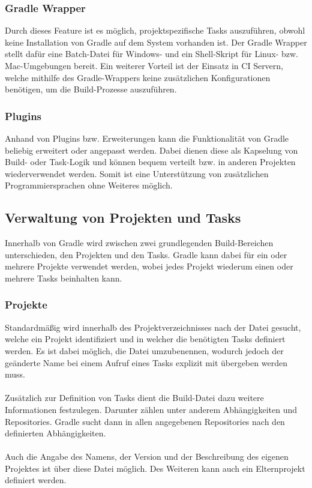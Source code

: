 \subsubsection{Gradle Wrapper}
Durch dieses Feature ist es möglich, projektspezifische Tasks auszuführen, obwohl keine Installation von Gradle auf dem System vorhanden ist. Der Gradle Wrapper stellt dafür eine Batch-Datei für Windows- und ein Shell-Skript für Linux- bzw. Mac-Umgebungen bereit. Ein weiterer Vorteil ist der Einsatz in \gls{CI} Servern, welche mithilfe des Gradle-Wrappers keine zusätzlichen Konfigurationen benötigen, um die Build-Prozesse auszuführen.

\subsubsection{Plugins}
Anhand von Plugins bzw. Erweiterungen kann die Funktionalität von Gradle beliebig erweitert oder angepasst werden. Dabei dienen diese als Kapselung von Build- oder Task-Logik und können bequem verteilt bzw. in anderen Projekten wiederverwendet werden. Somit ist eine Unterstützung von zusätzlichen Programmiersprachen ohne Weiteres möglich.

\subsection{Verwaltung von Projekten und Tasks}
Innerhalb von Gradle  wird zwischen zwei grundlegenden Build-Bereichen unterschieden, den Projekten und den Tasks. Gradle kann dabei für ein oder mehrere Projekte verwendet werden, wobei jedes Projekt wiederum einen oder mehrere Tasks beinhalten kann.

\subsubsection{Projekte}
Standardmäßig wird innerhalb des Projektverzeichnisses nach der Datei  gesucht, welche ein Projekt identifiziert und in welcher die benötigten Tasks definiert werden. Es ist dabei möglich, die  Datei umzubenennen, wodurch jedoch der geänderte Name bei einem Aufruf eines Tasks explizit mit übergeben werden muss.\\
\\
Zusätzlich zur Definition von Tasks dient die Build-Datei dazu weitere Informationen festzulegen. Darunter zählen unter anderem Abhängigkeiten und Repositories. Gradle sucht dann in allen angegebenen Repositories nach den definierten Abhängigkeiten.\\
\\
Auch die Angabe des Namens, der Version und der Beschreibung des eigenen Projektes ist über diese Datei möglich. Des Weiteren kann auch ein Elternprojekt definiert werden.

